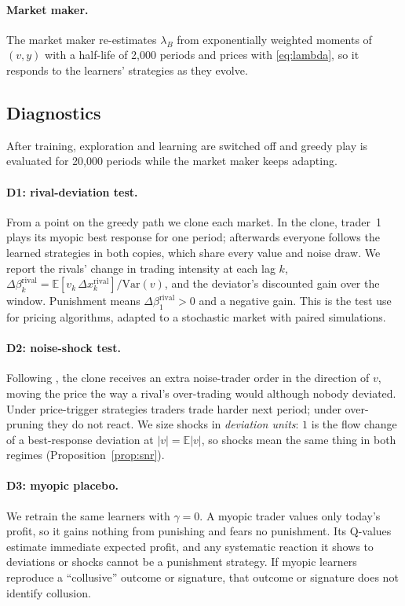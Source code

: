 \paragraph{Market maker.} The market maker re-estimates $\lambda_B$ from
exponentially weighted moments of $(v,y)$ with a half-life of 2{,}000 periods
and prices with \eqref{eq:lambda}, so it responds to the learners' strategies
as they evolve.

\subsection{Diagnostics}

After training, exploration and learning are switched off and greedy play is
evaluated for 20{,}000 periods while the market maker keeps adapting.

\paragraph{D1: rival-deviation test.} From a point on the greedy path we clone
each market. In the clone, trader~1 plays its myopic best response for one
period; afterwards everyone follows the learned strategies in both copies,
which share every value and noise draw. We report the rivals' change in
trading intensity at each lag $k$,
$\Delta\beta^{\mathrm{rival}}_k=\mathbb E[v_k\,\Delta x^{\mathrm{rival}}_k]/\mathrm{Var}(v)$,
and the deviator's discounted gain over the window. Punishment means
$\Delta\beta^{\mathrm{rival}}_1>0$ and a negative gain. This is the test
\citet{calvano2020} use for pricing algorithms, adapted to a stochastic market
with paired simulations.

\paragraph{D2: noise-shock test.} Following \citet{dou2025}, the clone
receives an extra noise-trader order in the direction of $v$, moving the price
the way a rival's over-trading would although nobody deviated. Under
price-trigger strategies traders trade harder next period; under over-pruning
they do not react. We size shocks in \emph{deviation units}: $1$ is the flow
change of a best-response deviation at $|v|=\mathbb E|v|$, so shocks mean the
same thing in both regimes (Proposition~\ref{prop:snr}).

\paragraph{D3: myopic placebo.} We retrain the same learners with $\gamma=0$.
A myopic trader values only today's profit, so it gains nothing from
punishing and fears no punishment. Its Q-values estimate immediate expected
profit, and any systematic reaction it shows to deviations or shocks cannot be
a punishment strategy. If myopic learners reproduce a ``collusive'' outcome or
signature, that outcome or signature does not identify collusion.

